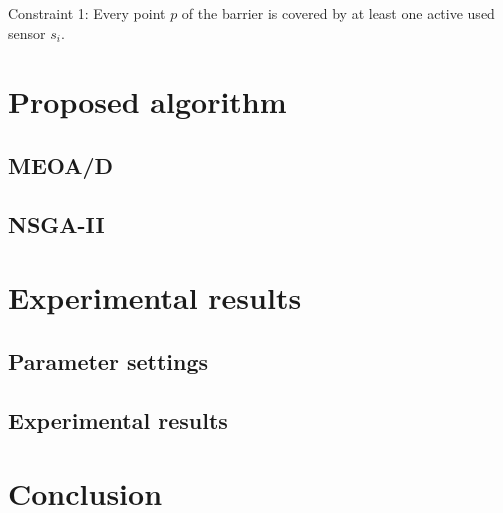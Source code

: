 \documentclass[preprint,12pt]{elsarticle}
\begin{document}
Constraint 1: Every point $p$ of the barrier is covered by at least one active
used sensor $s_i$.

\section{Proposed algorithm}\label{algorithms_sec}
\subsection{MEOA/D}
\subsection{NSGA-II}

\section{Experimental results}
\subsection{Parameter settings}



\subsection{Experimental results}
\section{Conclusion}\label{conclusion_sec}

\appendix



\end{document}
